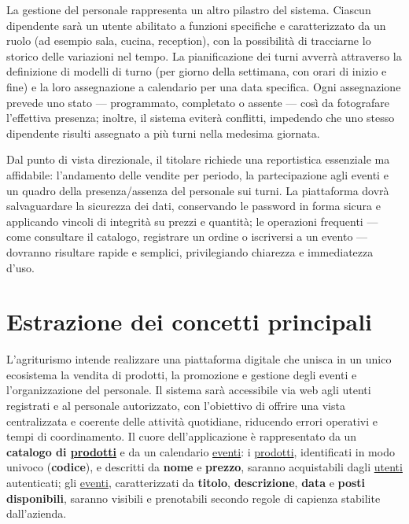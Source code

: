 \documentclass[a4paper,12pt]{report}
\begin{document}
La gestione del personale rappresenta un altro pilastro del sistema.
Ciascun dipendente sarà un
utente abilitato a funzioni specifiche e caratterizzato da un ruolo
(ad esempio sala, cucina,
reception), con la possibilità di tracciarne lo storico delle
variazioni nel tempo. La
pianificazione dei turni avverrà attraverso la definizione di modelli
di turno (per giorno della
settimana, con orari di inizio e fine) e la loro assegnazione a
calendario per una data
specifica. Ogni assegnazione prevede uno stato — programmato,
completato o assente — così da
fotografare l'effettiva presenza; inoltre, il sistema eviterà
conflitti, impedendo che uno
stesso dipendente risulti assegnato a più turni nella medesima giornata.

Dal punto di vista direzionale, il titolare richiede una reportistica
essenziale ma
affidabile: l'andamento delle vendite per periodo, la partecipazione
agli eventi e un quadro
della presenza/assenza del personale sui turni. La piattaforma dovrà
salvaguardare la sicurezza
dei dati, conservando le password in forma sicura e applicando
vincoli di integrità su prezzi e
quantità; le operazioni frequenti — come consultare il catalogo,
registrare un ordine o
iscriversi a un evento — dovranno risultare rapide e semplici,
privilegiando chiarezza e
immediatezza d'uso.

\section{Estrazione dei concetti principali}

L'agriturismo intende realizzare una piattaforma digitale che unisca
in un unico ecosistema la
vendita di prodotti, la promozione e gestione degli eventi e
l'organizzazione del personale. Il
sistema sarà accessibile via web agli utenti registrati e al
personale autorizzato, con
l'obiettivo di offrire una vista centralizzata e coerente delle
attività quotidiane, riducendo
errori operativi e tempi di coordinamento. Il cuore dell'applicazione
è rappresentato da un
\textbf{catalogo di \underline{prodotti}} e da un calendario
\underline{eventi}: i
\underline{prodotti}, identificati in modo univoco (\textbf{codice}),
e descritti da
\textbf{nome} e \textbf{prezzo}, saranno acquistabili dagli
\underline{utenti} autenticati; gli
\underline{eventi}, caratterizzati da \textbf{titolo},
\textbf{descrizione}, \textbf{data} e
\textbf{posti disponibili}, saranno visibili e prenotabili secondo
regole di capienza stabilite
dall'azienda.
\end{document}
